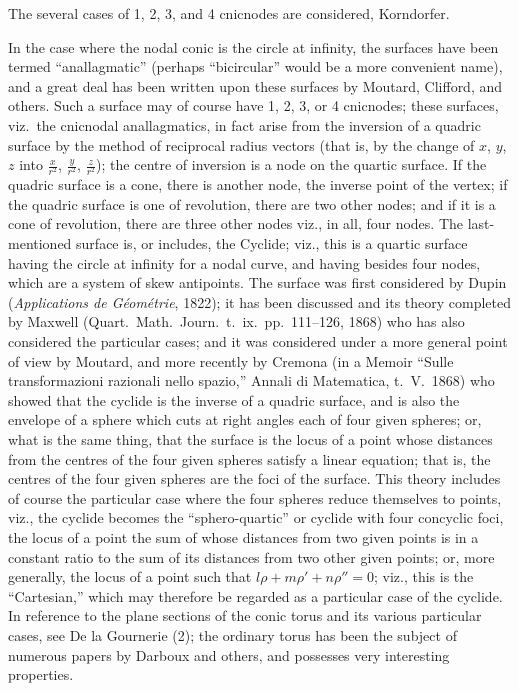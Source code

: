 \documentclass[11pt,a4paper]{article}
\begin{document}
The several cases of 1, 2, 3, and 4 cnicnodes are considered, Korndorfer.

In the case where the nodal conic is the circle at infinity, the surfaces have been termed ``anallagmatic'' (perhaps ``bicircular'' would be a more convenient name), and a great deal has been written upon these surfaces by Moutard, Clifford, and others. Such a surface may of course have 1, 2, 3, or 4 cnicnodes; these surfaces, viz.\ the cnicnodal anallagmatics, in fact arise from the inversion of a quadric surface by the method of reciprocal radius vectors (that is, by the change of $x$, $y$, $z$ into $\frac{x}{r^2}$, $\frac{y}{r^2}$, $\frac{z}{r^2}$); the centre of inversion is a node on the quartic surface. If the quadric surface is a cone, there is another node, the inverse point of the vertex; if the quadric surface is one of revolution, there are two other nodes; and if it is a cone of revolution, there are three other nodes viz., in all, four nodes. The last-mentioned surface is, or includes, the Cyclide; viz., this is a quartic surface having the circle at infinity for a nodal curve, and having besides four nodes, which are a system of skew antipoints. The surface was first considered by Dupin (\textit{Applications de G\'eom\'etrie}, 1822); it has been discussed and its theory completed by Maxwell (Quart.\ Math.\ Journ.\ t.~ix.\ pp.~111--126, 1868) who has also considered the particular cases; and it was considered under a more general point of view by Moutard, and more recently by Cremona (in a Memoir ``Sulle transformazioni razionali nello spazio,'' Annali di Matematica, t.~V.\ 1868) who showed that the cyclide is the inverse of a quadric surface, and is also the envelope of a sphere which cuts at right angles each of four given spheres; or, what is the same thing, that the surface is the locus of a point whose distances from the centres of the four given spheres satisfy a linear equation; that is, the centres of the four given spheres are the foci of the surface. This theory includes of course the particular case where the four spheres reduce themselves to points, viz., the cyclide becomes the ``sphero-quartic'' or cyclide with four concyclic foci, the locus of a point the sum of whose distances from two given points is in a constant ratio to the sum of its distances from two other given points; or, more generally, the locus of a point such that $l\rho + m\rho' + n\rho'' = 0$; viz., this is the ``Cartesian,'' which may therefore be regarded as a particular case of the cyclide. In reference to the plane sections of the conic torus and its various particular cases, see De la Gournerie (2); the ordinary torus has been the subject of numerous papers by Darboux and others, and possesses very interesting properties.
\end{document}

